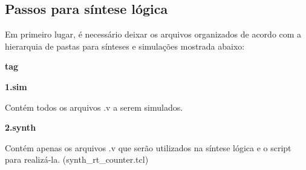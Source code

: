 \begin{apendicesenv}

\partapendices
\chapter{Passos para síntese lógica}

Em primeiro lugar, é necessário deixar os arquivos organizados de acordo com a hierarquia de pastas para sínteses e simulações mostrada abaixo:

\textbf{tag}

\textbf{1.sim}

Contém todos os arquivos .v a serem simulados.
    
\textbf{2.synth}

Contém apenas os arquivos .v que serão utilizados na síntese lógica e o script para realizá-la. (synth\_rt\_counter.tcl)


\end{apendicesenv}
